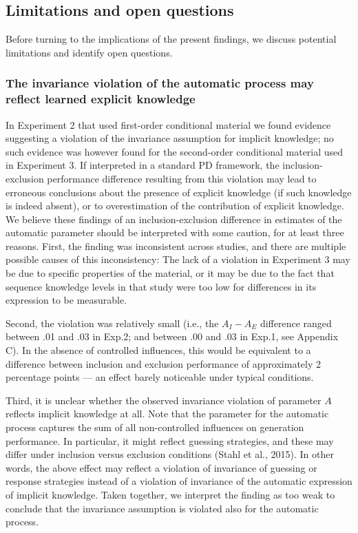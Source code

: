 \documentclass[man]{apa6}
\theoremstyle{definition}
\theoremstyle{definition}
\theoremstyle{definition}
\theoremstyle{remark}
\begin{document}
\subsection{Limitations and open
questions}\label{limitations-and-open-questions}

Before turning to the implications of the present findings, we discuss
potential limitations and identify open questions.

\subsubsection{The invariance violation of the automatic process may
reflect learned explicit
knowledge}\label{the-invariance-violation-of-the-automatic-process-may-reflect-learned-explicit-knowledge}

In Experiment 2 that used first-order conditional material we found
evidence suggesting a violation of the invariance assumption for
implicit knowledge; no such evidence was however found for the
second-order conditional material used in Experiment 3. If interpreted
in a standard PD framework, the inclusion-exclusion performance
difference resulting from this violation may lead to erroneous
conclusions about the presence of explicit knowledge (if such knowledge
is indeed absent), or to overestimation of the contribution of explicit
knowledge. We believe these findings of an inclusion-exclusion
difference in estimates of the automatic parameter should be interpreted
with some caution, for at least three reasons. First, the finding was
inconsistent across studies, and there are multiple possible causes of
this inconsistency: The lack of a violation in Experiment 3 may be due
to specific properties of the material, or it may be due to the fact
that sequence knowledge levels in that study were too low for
differences in its expression to be measurable.

Second, the violation was relatively small (i.e., the \(A_{I}-A_{E}\)
difference ranged between .01 and .03 in Exp.2; and between .00 and .03
in Exp.1, see Appendix C). In the absence of controlled influences, this
would be equivalent to a difference between inclusion and exclusion
performance of approximately 2 percentage points --- an effect barely
noticeable under typical conditions.

Third, it is unclear whether the observed invariance violation of
parameter \(A\) reflects implicit knowledge at all. Note that the
parameter for the automatic process captures the sum of all
non-controlled influences on generation performance. In particular, it
might reflect guessing strategies, and these may differ under inclusion
versus exclusion conditions (Stahl et al., 2015). In other words, the
above effect may reflect a violation of invariance of guessing or
response strategies instead of a violation of invariance of the
automatic expression of implicit knowledge. Taken together, we interpret
the finding as too weak to conclude that the invariance assumption is
violated also for the automatic process.
\end{document}
